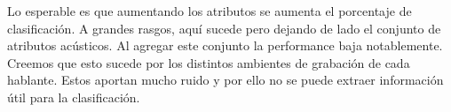 Lo esperable es que aumentando los atributos se aumenta el porcentaje de clasificación. A grandes rasgos, aquí sucede pero dejando de lado el conjunto de atributos acústicos. Al agregar este conjunto la performance baja notablemente. Creemos que esto sucede por los distintos ambientes de grabación de cada hablante. Estos aportan mucho ruido y por ello no se puede extraer información útil para la clasificación.